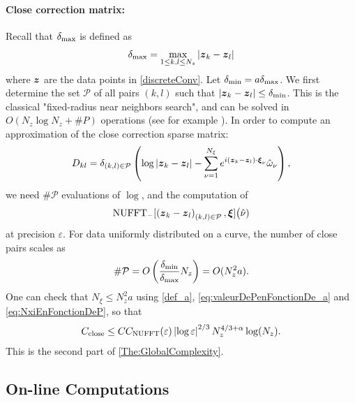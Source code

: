 \documentclass[smallextended]{svjour3}
\begin{document}
\paragraph{Close correction matrix:} Recall that $\delta_{\max}$ is defined as 
\[\delta_{\max} = \max_{1\leq k,l\leq N_z} |\boldsymbol{z}_k - \boldsymbol{z}_l|\]
where $\boldsymbol{z}$ are the data points in \eqref{discreteConv}. Let $\delta_{\min} = a \delta_{\max}$. We first determine the set $\mathcal{P}$ of all pairs $(k,l)$ such that $\left\lvert \boldsymbol{z}_k - \boldsymbol{z}_l \right\rvert \leq \delta_{\min}$. This is the classical "fixed-radius near neighbors search", and can be solved in $O(N_z \log N_z + \# P)$ operations (see for example \cite{bentley1975multidimensional, bentley1977complexity,turau1991fixed,dickerson1990fixed}). In order to compute an approximation of the close correction sparse matrix:
\[D_{kl} = \delta_{(k,l) \in \mathcal{P}} \left( \log\left\lvert \boldsymbol{z}_k - \boldsymbol{z}_l \right\rvert - \sum_{\nu = 1}^{N_{\xi}}e^{i (\boldsymbol{z}_k - \boldsymbol{z}_l)\cdot \boldsymbol{\xi}_\nu} \hat{\omega}_\nu\right),\]
we need $\#\mathcal{P}$ evaluations of $\log$, and the computation of 
\[\operatorname{NUFFT}_-[\left(\boldsymbol{z}_k - \boldsymbol{z}_l\right)_{(k,l)\in\mathcal{P}},\boldsymbol{\xi}]\big(\hat{\nu})\]
at precision $\varepsilon$. For data uniformly distributed on a curve, the number of close pairs scales as 
\begin{equation}
	\label{eq:NombreDinteractionsProches}
	\# \mathcal{P} = O\left(\dfrac{\delta_{\min}}{\delta_{\max}} N_z\right) = O(N_z^2 a).
\end{equation}
One can check that $N_\xi \leq N_z^2a$ using \eqref{def_a}, \eqref{eq:valeurDePenFonctionDe_a} and \eqref{eq:NxiEnFonctionDeP}, so that 
\begin{equation}
	\label{Complex:assemble}
	C_{\textup{close}} \leq C C_{\textup{NUFFT}}(\varepsilon)\left\lvert \log{\varepsilon} \right\rvert^{2/3}N_z^{4/3 + \alpha}\log(N_z).
\end{equation}
This is the second part of \autoref{The:GlobalComplexity}. 
\subsection{On-line Computations}
\end{document}
